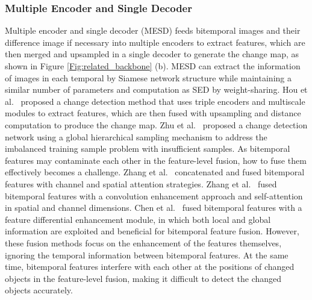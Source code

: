\documentclass[journal]{IEEEtran}
\begin{document}
\subsubsection{Multiple Encoder and Single Decoder}
Multiple encoder and single decoder (MESD) feeds bitemporal images and their difference image if necessary into multiple encoders to extract features, which are then merged and upsampled in a single decoder to generate the change map, as shown in Figure \ref{Fig:related_backbone} (b). MESD can extract the information of images in each temporal by Siamese network structure while maintaining a similar number of parameters and computation as SED by weight-sharing. Hou et al.~\cite{hrtn} proposed a change detection method that uses triple encoders and multiscale modules to extract features, which are then fused with upsampling and distance computation to produce the change map.  Zhu et al.~\cite{lulc} proposed a change detection network using a global hierarchical sampling mechanism to address the imbalanced training sample problem with insufficient samples. As bitemporal features may contaminate each other in the feature-level fusion, how to fuse them effectively becomes a challenge. Zhang
et al.~\cite{dsifn} concatenated and fused bitemporal features with channel and spatial attention strategies. Zhang et al.~\cite{olcd} fused bitemporal features with a convolution enhancement approach and self-attention in spatial and channel dimensions. Chen
et al.~\cite{edge} fused bitemporal features with a feature differential enhancement module, in which both local and global information are exploited and beneficial for bitemporal feature fusion. However, these fusion methods focus on the enhancement of the features themselves, ignoring the temporal information between bitemporal features. At the same time, bitemporal features interfere with each other at the positions of changed objects in the feature-level fusion, making it difficult to detect the changed objects accurately.
\end{document}
